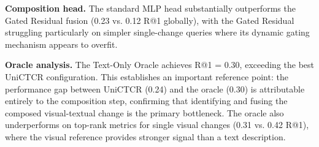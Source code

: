 \textbf{Composition head.} The standard MLP head
substantially outperforms the Gated Residual fusion
(0.23 vs. 0.12 R@1 globally), with the Gated Residual
struggling particularly on simpler single-change queries
where its dynamic gating mechanism appears to overfit.
 
\textbf{Oracle analysis.} The Text-Only Oracle achieves
R@1 = 0.30, exceeding the best UniCTCR configuration.
This establishes an important reference point: the
performance gap between UniCTCR (0.24) and the oracle
(0.30) is attributable entirely to the composition step,
confirming that identifying and fusing the composed
visual-textual change is the primary bottleneck. The
oracle also underperforms on top-rank metrics for single
visual changes (0.31 vs. 0.42 R@1), where the visual
reference provides stronger signal than a text description.
 
